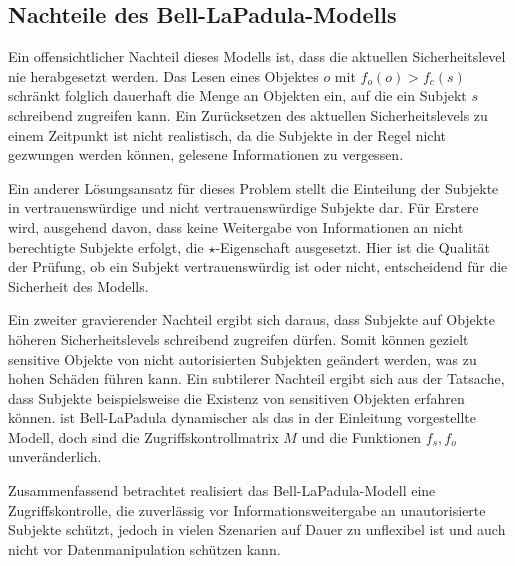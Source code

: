 \subsection{Nachteile des Bell-LaPadula-Modells}\indexBellLaPadula
Ein offensichtlicher Nachteil dieses Modells ist, dass die aktuellen
Sicherheitslevel nie herabgesetzt werden. Das Lesen eines Objektes \(o\)
mit \(f_o(o) > f_c(s)\) schränkt folglich dauerhaft die Menge an
Objekten ein, auf die ein Subjekt \(s\) schreibend zugreifen kann. Ein
Zurücksetzen des aktuellen Sicherheitslevels zu einem Zeitpunkt ist
nicht realistisch, da die Subjekte in der Regel nicht gezwungen werden
können, gelesene Informationen zu vergessen.

Ein anderer Lösungsansatz für dieses Problem stellt die Einteilung der
Subjekte in vertrauenswürdige und nicht vertrauenswürdige Subjekte
dar. Für Erstere wird, ausgehend davon, dass keine Weitergabe von
Informationen an nicht berechtigte Subjekte erfolgt, die
\(\star\)-Eigenschaft ausgesetzt. Hier ist die Qualität der Prüfung, ob
ein Subjekt vertrauenswürdig ist oder nicht, entscheidend für die
Sicherheit des Modells.

Ein zweiter gravierender Nachteil ergibt sich daraus, dass Subjekte auf
Objekte höheren Sicherheitslevels schreibend zugreifen dürfen. Somit
können gezielt sensitive Objekte von nicht autorisierten Subjekten
geändert werden, was zu hohen Schäden führen kann.  Ein subtilerer
Nachteil ergibt sich aus der Tatsache, dass Subjekte beispielsweise die
Existenz von sensitiven Objekten erfahren können. %
ist Bell-LaPadula dynamischer als das in der Einleitung vorgestellte
Modell, doch sind die Zugriffskontrollmatrix \(M\) und die Funktionen
\(f_s, f_o\) unveränderlich.

Zusammenfassend betrachtet realisiert das Bell-LaPadula-Modell eine
Zugriffskontrolle, die zuverlässig vor Informationsweitergabe an
unautorisierte Subjekte schützt, jedoch in vielen Szenarien auf Dauer zu
unflexibel ist und auch nicht vor Datenmanipulation schützen kann.

